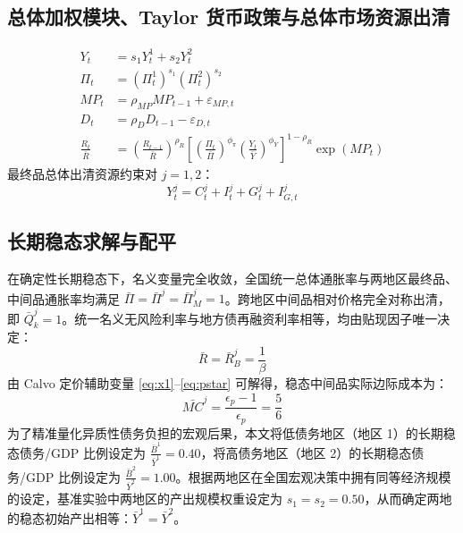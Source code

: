 \documentclass[12pt,UTF8]{ctexart}
\begin{document}
	\subsection{总体加权模块、Taylor 货币政策与总体市场资源出清}
	\begin{align}
		Y_t &=s_1Y_t^1+s_2Y_t^2 \label{a37}\\
		\Pi_t &=(\Pi_t^1)^{s_1}(\Pi_t^2)^{s_2} \label{a38}\\
		MP_t &=\rho_{MP}MP_{t-1}+\varepsilon_{MP,t} \label{a39}\\
		D_t &=\rho_D D_{t-1} - \varepsilon_{D,t} \label{a40}\\
		\frac{R_t}{\bar R} &=\left(\frac{R_{t-1}}{\bar R}\right)^{\rho_R} \left[ \left(\frac{\Pi_t}{\bar\Pi}\right)^{\phi_\pi} \left(\frac{Y_t}{\bar Y}\right)^{\phi_Y} \right]^{1-\rho_R}\exp(MP_t) \label{a41}
	\end{align}
	最终品总体出清资源约束对 $j=1,2$：
	\begin{equation}
		Y_t^j=C_t^j+I_t^j+G_t^j+I_{G,t}^j \label{a42}
	\end{equation}
	
	\subsection{长期稳态求解与配平}
	
	在确定性长期稳态下，名义变量完全收敛，全国统一总体通胀率与两地区最终品、中间品通胀率均满足 $\bar{\Pi} = \bar{\Pi}^j = \bar{\Pi}_M^j = 1$。跨地区中间品相对价格完全对称出清，即 $\bar{Q}_{k}^j = 1$。统一名义无风险利率与地方债再融资利率相等，均由贴现因子唯一决定：
	\begin{equation}
		\bar{R} = \bar{R}_B^j = \frac{1}{\beta}
	\end{equation}
	由 Calvo 定价辅助变量 \eqref{eq:x1}--\eqref{eq:pstar} 可解得，稳态中间品实际边际成本为：
	\begin{equation}
		\bar{MC}^j = \frac{\epsilon_p-1}{\epsilon_p} = \frac{5}{6}
	\end{equation}
	为了精准量化异质性债务负担的宏观后果，本文将低债务地区（地区 1）的长期稳态债务/GDP 比例设定为 $\frac{\bar{B}^1}{\bar{Y}^1} = 0.40$，将高债务地区（地区 2）的长期稳态债务/GDP 比例设定为 $\frac{\bar{B}^2}{\bar{Y}^2} = 1.00$。根据两地区在全国宏观决策中拥有同等经济规模的设定，基准实验中两地区的产出规模权重设定为 $s_1 = s_2 = 0.50$，从而确定两地的稳态初始产出相等：$\bar{Y}^1 = \bar{Y}^2$。
	
\end{document}
